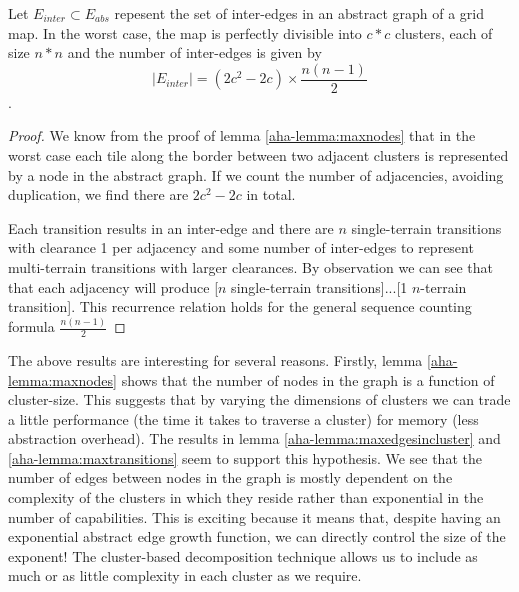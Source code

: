 \begin{lemma}
\label{aha-lemma:maxtransitions}
Let $E_{inter} \subset E_{abs}$ repesent the set of inter-edges in an abstract graph of a grid map. In the worst case, the map is perfectly divisible into $c*c$ clusters, each of size $n*n$ and the number of inter-edges is given by 
$$|E_{inter}| = (2c^2 - 2c)\times \frac{n(n-1)}{2}$$.
\end{lemma}

\begin{proof}
We know from the proof of lemma \ref{aha-lemma:maxnodes} that in the worst case each tile along the border between two adjacent clusters is represented by a node in the abstract graph. 
If we count the number of adjacencies, avoiding duplication, we find there are $2c^2 - 2c$ in total.
\par \indent
Each transition results in an inter-edge and there are $n$ single-terrain transitions with clearance 1 per adjacency and some number of inter-edges to represent multi-terrain transitions with larger clearances. 
By observation we can see that that each adjacency will produce [$n$ single-terrain transitions]...[1 $n$-terrain transition]. 
This recurrence relation holds for the general sequence counting formula $\frac{n(n-1)}{2}$
\end{proof}

The above results are interesting for several reasons. 
Firstly, lemma \ref{aha-lemma:maxnodes} shows that the number of nodes in the graph is a function of cluster-size. This suggests that by varying the dimensions of clusters we can trade a little performance (the time it takes to traverse a cluster) for memory (less abstraction overhead).
The results in lemma \ref{aha-lemma:maxedgesincluster} and \ref{aha-lemma:maxtransitions} seem to support this hypothesis. 
We see that the number of edges between nodes in the graph is mostly dependent on the complexity of the clusters in which they reside rather than exponential in the number of capabilities. 
This is exciting because it means that, despite having an exponential abstract edge growth function, we can directly control the size of the exponent! 
The cluster-based decomposition technique allows us to include as much or as little complexity in each cluster as we require.
